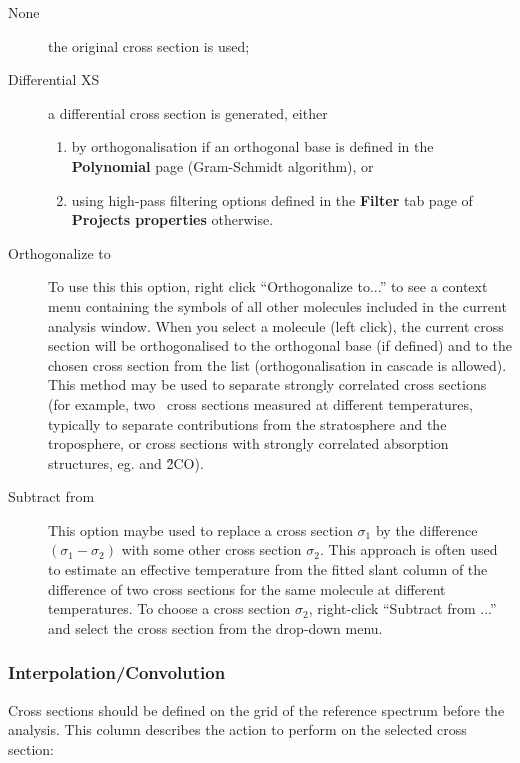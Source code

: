\begin{description}
\item[None] the original cross section is used;
\item[Differential XS] a differential cross section is generated, either
  \begin{enumerate}
  \item by orthogonalisation if an orthogonal base is defined in the \textbf{Polynomial} page (Gram-Schmidt algorithm), or
  \item using high-pass filtering options defined in the \textbf{Filter} tab page of \textbf{Projects properties} otherwise.
  \end{enumerate}
\item[Orthogonalize to] To use this this option, right click ``Orthogonalize to...'' to see a context menu containing the symbols of all other molecules included in the current analysis window. When you select a molecule (left click), the current cross section will be orthogonalised to the  orthogonal base (if defined) and to the chosen cross section from
  the list (orthogonalisation in cascade is allowed).  This method may be used to separate strongly correlated cross sections (for example, two \ozone~cross sections measured at different temperatures, typically to separate contributions from the stratosphere and the troposphere, or cross sections with strongly correlated absorption structures, eg. \BrO{} and \H2CO).
\item[Subtract from] This option maybe used to replace a cross section $\sigma_1$ by the difference $(\sigma_1 - \sigma_2)$ with some other cross section $\sigma_2$.  This approach is often used to estimate an effective temperature from the fitted slant column of the difference of two cross sections for the same molecule at different temperatures.  To choose a cross section $\sigma_2$, right-click ``Subtract from ...'' and select the cross section from the drop-down menu. 
\end{description}

\subsubsection{Interpolation/Convolution}
Cross sections should be defined on the grid of the reference spectrum before the analysis. This column describes the action to perform on the selected cross section:


